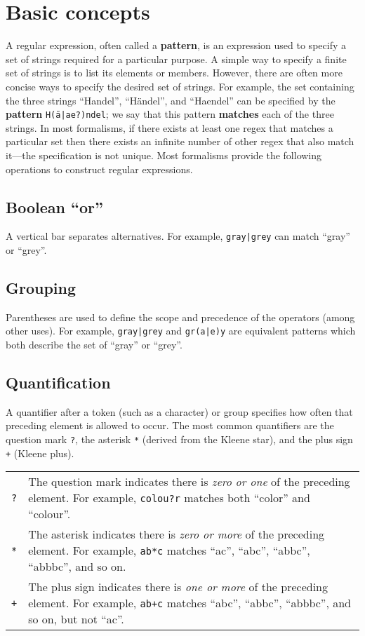 \chapter{Basic concepts}
\label{chap:concept}

A regular expression, often called a \textbf{pattern}, is an
expression used to specify a set of strings required for a particular
purpose. A simple way to specify a finite set of strings is to list
its elements or members. However, there are often more concise ways to
specify the desired set of strings. For example, the set containing
the three strings ``Handel'', ``H\"andel'', and ``Haendel'' can be
specified by the \textbf{pattern} \texttt{H(\"a|ae?)ndel}; we say that
this pattern \textbf{matches} each of the three strings. In most
formalisms, if there exists at least one regex that matches a
particular set then there exists an infinite number of other regex
that also match it---the specification is not unique. Most formalisms
provide the following operations to construct regular expressions.

\section{Boolean ``or''}
  A vertical bar separates alternatives. For example, \verb/gray|grey/ can
  match ``gray'' or ``grey''.

\section{Grouping}
  Parentheses are used to define the scope and precedence of the
  operators (among other uses). For example, \verb/gray|grey/ and
  \verb/gr(a|e)y/ are equivalent patterns which both describe the set
  of ``gray'' or ``grey''.

\section{Quantification}
  A quantifier after a token (such as a character) or group specifies
  how often that preceding element is allowed to occur. The most
  common quantifiers are the question mark \verb|?|, the asterisk
  \verb|*| (derived from the Kleene star), and the plus sign \verb|+| (Kleene
  plus).

  \begin{tabularx}{335pt}{lX}
    \verb|?| & The question mark indicates there is \textsl{zero or
    one} of the preceding element. For example, \verb|colou?r| matches
    both ``color'' and ``colour''.\\
    \verb|*| & The asterisk indicates there is \textsl{zero or
    more} of the preceding element. For example, \verb|ab*c| matches
    ``ac'', ``abc'', ``abbc'', ``abbbc'', and so on.\\
    \verb|+| & The plus sign indicates there is \textsl{one or
    more} of the preceding element. For example, \verb|ab+c| matches
    ``abc'', ``abbc'', ``abbbc'', and so on, but not ``ac''.
  \end{tabularx}


